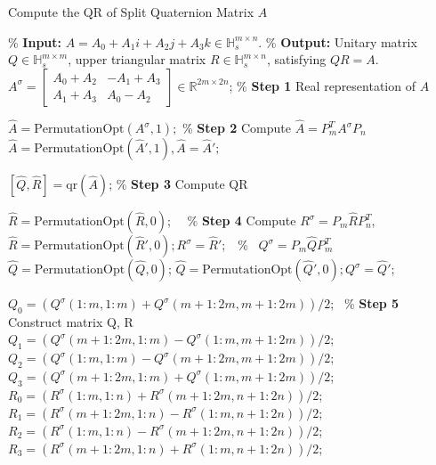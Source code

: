 \documentclass[3p]{elsarticle}
\numberwithin{equation}{section}
\begin{document}
\begin{algorithm}[htbp] 
    \caption{Compute the QR of Split Quaternion Matrix \(A\)}
    \label{alg:QR}
    \begin{algorithmic}[1]
        \State \% \textbf{Input:} \(A = A_0 + A_1 i + A_2 j + A_3 k \in \mathbb{H}_s^{m\times n}\).
        \State \% \textbf{Output:} Unitary matrix \(Q \in \mathbb{H}_s^{m\times m}\), upper triangular matrix \(R \in \mathbb{H}_s^{m\times n}\), satisfying \(Q  R = A\).
        \State \(A^\sigma = \begin{bmatrix}
            A_0 + A_2 & -A_1 + A_3 \\ 
            A_1 + A_3 & A_0 - A_2
            \end{bmatrix} \in \mathbb{R}^{2m\times 2n}\); \qquad\qquad\qquad\qquad \% \textbf{Step 1} Real representation of $A$
        
        \State $\widehat{A}=\text{PermutationOpt}(A^\sigma,1);$  \qquad\qquad\qquad\qquad\qquad\qquad\quad\% \textbf{Step 2} Compute \(\widehat{A} = P_{m}^T A^\sigma P_{n}\)
        \State $\widehat{A}=\text{PermutationOpt}(\widehat{A}',1),\widehat{A}=\widehat{A}';$
        
        \State \([\widehat{Q},\widehat{R}] = \text{qr}(\widehat{A})\); \qquad\qquad\qquad\qquad\qquad\qquad\qquad\qquad\qquad\quad\% \textbf{Step 3} Compute QR
        
        \State $\widehat{R}=\text{PermutationOpt}(\widehat{R},0)$; \qquad\qquad\qquad\qquad\qquad\qquad\quad\ \ \% \textbf{Step 4} Compute \(R^\sigma = P_{m}\widehat{R}P_{n}^T\), 
        \State $\widehat{R}=\text{PermutationOpt}(\widehat{R}',0);R^\sigma=\widehat{R}'$;\qquad\qquad\qquad\qquad\quad\ \ \% \qquad\quad \ \(Q^\sigma =      P_{m}\widehat{Q}P_{m}^T\)
        \State $\widehat{Q}=\text{PermutationOpt}(\widehat{Q},0)$;
        \State $\widehat{Q}=\text{PermutationOpt}(\widehat{Q}',0);Q^\sigma=\widehat{Q}'$;
        
        \State $Q_0 = (Q^\sigma(1\!:\!m,1\!:\!m) + Q^\sigma(m+1\!:\!2m,m+1\!:\!2m))/2$; \qquad\ \% \textbf{Step 5} Construct matrix Q, R
        \State $Q_1 = (Q^\sigma(m+1\!:\!2m,1\!:\!m) - Q^\sigma(1\!:\!m,m+1\!:\!2m))/2$;
        \State $Q_2 = (Q^\sigma(1\!:\!m,1\!:\!m) - Q^\sigma(m+1\!:\!2m,m+1\!:\!2m))/2$;
        \State $Q_3 = (Q^\sigma(m+1\!:\!2m,1\!:\!m) + Q^\sigma(1\!:\!m,m+1\!:\!2m))/2$;
        \State $R_0 = (R^\sigma(1\!:\!m,1\!:\!n) + R^\sigma(m+1\!:\!2m,n+1\!:\!2n))/2$;
        \State $R_1 = (R^\sigma(m+1\!:\!2m,1\!:\!n) - R^\sigma(1\!:\!m,n+1\!:\!2n))/2$;
        \State $R_2 = (R^\sigma(1\!:\!m,1\!:\!n) - R^\sigma(m+1\!:\!2m,n+1\!:\!2n))/2$;
        \State $R_3 = (R^\sigma(m+1\!:\!2m,1\!:\!n) + R^\sigma(1\!:\!m,n+1\!:\!2n))/2$;


\end{algorithmic}
\end{algorithm}
\end{document}
